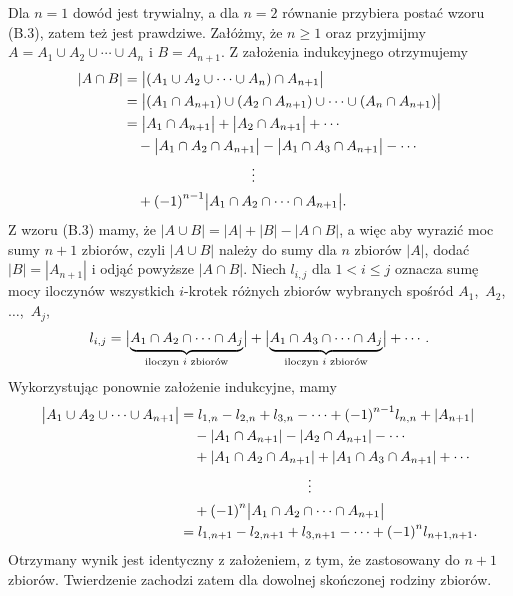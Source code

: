 Dla $n=1$ dowód jest trywialny, a dla $n=2$ równanie przybiera postać wzoru (B.3), zatem też jest prawdziwe. Załóżmy, że $n\ge 1$ oraz przyjmijmy $A=A_1\cup A_2\cup\cdots\cup A_n$ i $B=A_{n+1}$. Z założenia indukcyjnego otrzymujemy
\[
	\begin{split}
		|A\cap B| &= \bigl|(A_1\cup A_2\cup\cdots\cup A_n)\cap A_{n+1}\bigr| \\
		&= \bigl|(A_1\cap A_{n+1})\cup(A_2\cap A_{n+1})\cup\cdots\cup(A_n\cap A_{n+1})\bigr| \\
		&= \bigl|A_1\cap A_{n+1}\bigr|+\bigl|A_2\cap A_{n+1}\bigr|+\cdots \\
		&\quad -\bigl|A_1\cap A_2\cap A_{n+1}\bigr|-\bigl|A_1\cap A_3\cap A_{n+1}\bigr|-\cdots \\
		&\hspace{1.25in}\vdots \\
		&\quad +{(-1)}^{n-1}\bigl|A_1\cap A_2\cap\cdots\cap A_{n+1}\bigr|.
	\end{split}
\]
Z wzoru (B.3) mamy, że $|A\cup B|=|A|+|B|-|A\cap B|$, a więc aby wyrazić moc sumy $n+1$ zbiorów, czyli $|A\cup B|$ należy do sumy dla $n$ zbiorów $|A|$, dodać $|B|=|A_{n+1}|$ i odjąć powyższe $|A\cap B|$. Niech $l_{i,j}$ dla $1<i\le j$ oznacza sumę mocy iloczynów wszystkich $i$-krotek różnych zbiorów wybranych spośród $A_1$,~$A_2$, $\dots$,~$A_j$,
\[
	l_{i,j} = \bigl|\underbrace{A_1\cap A_2\cap\cdots\cap A_j}_{\text{\scriptsize iloczyn $i$ zbiorów}}\bigr| + \bigl|\underbrace{A_1\cap A_3\cap\cdots\cap A_j}_{\text{\scriptsize iloczyn $i$ zbiorów}}\bigr|+\cdots.
\]
Wykorzystując ponownie założenie indukcyjne, mamy
\[
	\begin{split}
		\bigl|A_1\cup A_2\cup\cdots\cup A_{n+1}\bigr| &= l_{1,n}-l_{2,n}+l_{3,n}-\cdots+{(-1)}^{n-1}l_{n,n}+|A_{n+1}| \\
		&\quad -|A_1\cap A_{n+1}|-|A_2\cap A_{n+1}|-\cdots \\
		&\quad +|A_1\cap A_2\cap A_{n+1}|+|A_1\cap A_3\cap A_{n+1}|+\cdots \\
		&\hspace{1.25in}\vdots \\
		&\quad +{(-1)}^n\bigl|A_1\cap A_2\cap\cdots\cap A_{n+1}\bigr| \\
		&= l_{1,n+1}-l_{2,n+1}+l_{3,n+1}-\cdots+{(-1)}^nl_{n+1,n+1}.
	\end{split}
\]
Otrzymany wynik jest identyczny z założeniem, z tym, że zastosowany do $n+1$ zbiorów. Twierdzenie zachodzi zatem dla dowolnej skończonej rodziny zbiorów.

